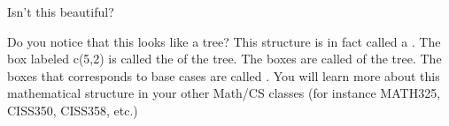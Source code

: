 Isn't this beautiful?

Do you notice that this looks like a tree? This structure is in fact
called a . The box labeled c(5,2) is called the
 of the tree. The boxes are called 
of the tree. The boxes that corresponds to base cases are called
. You will learn more about this
mathematical structure in your other Math/CS classes (for instance
MATH325, CISS350, CISS358, etc.)





